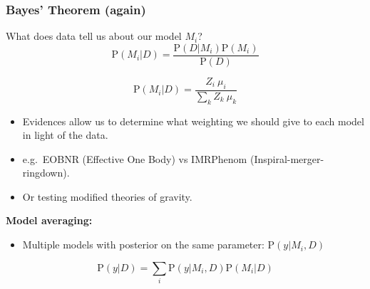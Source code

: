 \documentclass[%
]{beamer}
\newcommand{\prob}{\mathrm{P}}
\begin{document}
\begin{frame}
    \frametitle{Bayes' Theorem (again)}

    \pause
    What does data tell us about our model $M_i$?
    \pause
    \[\prob(M_i|D) = \frac{\prob(D|M_i) \prob(M_i) }{ \prob(D) }\] 

    \pause
    \[\prob(M_i|D) = \frac{Z_i \: \mu_i}{\sum_k Z_k \: \mu_k}\] 

    \begin{itemize}
    \pause \item Evidences allow us to determine what weighting we should give to each model in light of the data.\\
    \pause \item e.g.\ EOBNR (Effective One Body) vs IMRPhenom (Inspiral-merger-ringdown).\\
    \pause \item Or testing modified theories of gravity.
    \end{itemize}
    

    \pause
    \textbf{Model averaging:}
    \begin{itemize}
        \item Multiple models with posterior on the same parameter: ${\prob(y|M_i,D)}$
    \end{itemize}
    \[\prob(y|D) = \sum_i \prob(y|M_i,D) \prob(M_i|D)\]

\end{frame}
\end{document}
